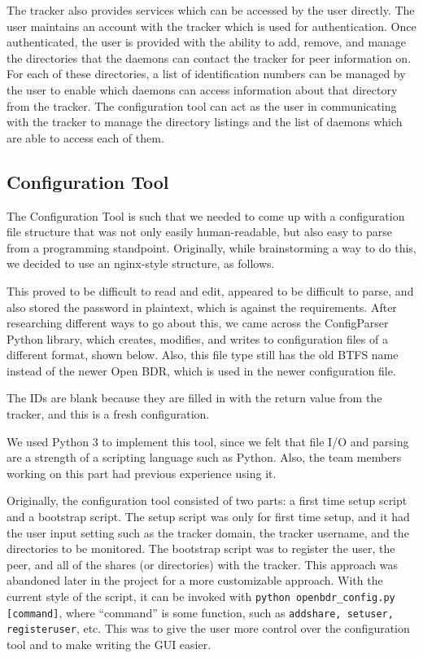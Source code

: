 \documentclass[12 pt]{article}
\begin{document}
	The tracker also provides services which can be accessed by the user directly. The user maintains an account with the tracker which is used for authentication. Once authenticated, the user is provided with the ability to add, remove, and manage the directories that the daemons can contact the tracker for peer information on. For each of these directories, a list of identification numbers can be managed by the user to enable which daemons can access information about that directory from the tracker. The configuration tool can act as the user in communicating with the tracker to manage the directory listings and the list of daemons which are able to access each of them.
	
	\subsection{Configuration Tool}
	
	The Configuration Tool is such that we needed to come up with a configuration file structure that was not only easily human-readable, but also easy to parse from a programming standpoint. Originally, while brainstorming a way to do this, we decided to use an nginx-style structure, as follows.
	
	
	
	This proved to be difficult to read and edit, appeared to be difficult to parse, and also stored the password in plaintext, which is against the requirements. After researching different ways to go about this, we came across the ConfigParser Python library, which creates, modifies, and writes to configuration files of a different format, shown below. Also, this file type still has the old BTFS name instead of the newer Open BDR, which is used in the newer configuration file.
	
	
	
	The IDs are blank because they are filled in with the return value from the tracker, and this is a fresh configuration. 
	
	We used Python 3 to implement this tool, since we felt that file I/O and parsing are a strength of a scripting language such as Python. Also, the team members working on this part had previous experience using it.
	
	Originally, the configuration tool consisted of two parts: a first time setup script and a bootstrap script. The setup script was only for first time setup, and it had the user input setting such as the tracker domain, the tracker username, and the directories to be monitored. The bootstrap script was to register the user, the peer, and all of the shares (or directories) with the tracker. This approach was abandoned later in the project for a more customizable approach. With the current style of the script, it can be invoked with \texttt{python openbdr\_config.py [command]}, where ``command'' is some function, such as \texttt{addshare, setuser, registeruser}, etc. This was to give the user more control over the configuration tool and to make writing the GUI easier.
	
\end{document}
